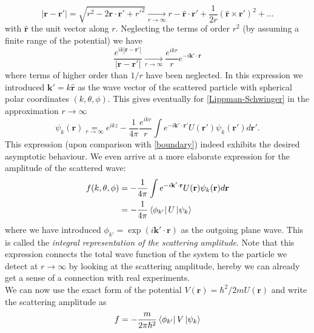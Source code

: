 \documentclass[11pt]{article}
\numberwithin{equation}{section}
\begin{document}
\begin{equation}
	|\mathbf{r}-\mathbf{r}'| = \sqrt{r^2 - 2 \mathbf{r} \cdot \mathbf{r}' + r'^2} \underset{r \rightarrow \infty} \rightarrow r - \mathbf{\hat{r}} \cdot \mathbf{r}' + \frac{1}{2r}(\mathbf{\hat{r}} \times \mathbf{r}')^2 + \ldots 
\end{equation}
with $\mathbf{\hat{r}}$ the unit vector along $r$. Neglecting the terms of order $r^2$ (by assuming a finite range of the potential) we have
\begin{equation}
\frac{e^{ik|\mathbf{r}-\mathbf{r}'|}}{|\mathbf{r}-\mathbf{r}'|} \underset{r \rightarrow \infty} \rightarrow \frac{e^{ikr}}{r} e^{-i \mathbf{k}' \cdot \mathbf{r}}
\end{equation}
 where terms of higher order than $1/r$ have been neglected. In this expression we introduced $\mathbf{k}' = k\mathbf{\hat{r}}$ as the wave vector of the scattered particle with spherical polar coordinates $(k, \theta, \phi)$. This gives eventually for \eqref{Lippman-Schwinger} in the approximation $r \rightarrow \infty$
 \begin{equation}
 	\psi_k(\mathbf{r}) \underset{r \rightarrow \infty} = e^{ikz} -  \frac{1}{4\pi}\frac{e^{ikr}}{r}\int	 e^{-i \mathbf{k}' \cdot \mathbf{r}'} U(\mathbf{r}')\psi_k(\mathbf{r}')d\mathbf{r}'.
 \end{equation}
 This expression (upon comparison with \eqref{boundary}) indeed exhibits the desired asymptotic behaviour. We even arrive at a more elaborate expression for the amplitude of the scattered wave:
 \begin{align}
 \begin{split}
 f(k,\theta, \phi) &= 	- \frac{1}{4\pi}\int	 e^{-i \mathbf{k}' \cdot \mathbf{r}} U(\mathbf{r})\psi_k(\mathbf{r})d\mathbf{r}\\
 & = - \frac{1}{4\pi} \bra{\phi_{k'}}U \ket{\psi_k}
 \end{split}
 \end{align}
 where we have introduced $\phi_{k'} = \exp(i\mathbf{k}'\cdot \mathbf{r})$ as the outgoing plane wave. 
This is called the \emph{integral representation of the scattering amplitude}. Note that this expression connects the total wave function of the system to the particle we detect at $r \rightarrow \infty$ by looking at the scattering amplitude, hereby we can already get a sense of a connection with real experiments.\\
We can now use the exact form of the potential $V(\mathbf{r}) = \hbar^2/2m U(\mathbf{r})$ and write the scattering amplitude as
\begin{equation}
	f = -\frac{m}{2\pi \hbar^2}\bra{\phi_{k'}}V \ket{\psi_k}
\end{equation}
\end{document}
